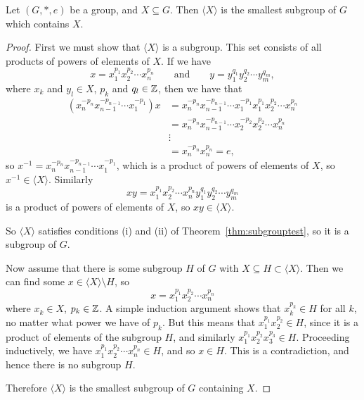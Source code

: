 \begin{theorem}\label{thm:subgroupgenbyset}
  Let $(G, \ast, e)$ be a group, and $X \subseteq G$.  Then $\langle X
  \rangle$ is the smallest subgroup of $G$ which contains $X$.
\end{theorem}
\begin{proof}
  First we must show that $\langle X \rangle$ is a subgroup.  This set
  consists of all products of powers of elements of $X$.  If we have
  \[
    x = x_{1}^{p_{1}}x_{2}^{p_{2}}\cdots x_{n}^{p_{n}} \qquad \text{and}
    \qquad y = y_{1}^{q_{1}}y_{2}^{q_{2}}\cdots y_{m}^{q_{m}},
  \]
  where $x_{k}$ and $y_{l} \in X$, $p_{k}$ and $q_{l} \in \mathbb{Z}$, then
  we have that
  \begin{align*}
    (x_{n}^{-p_{n}}x_{n-1}^{-p_{n-1}}\cdots x_{1}^{-p_{1}})x
     &= x_{n}^{-p_{n}}x_{n-1}^{-p_{n-1}}\cdots x_{1}^{-p_{1}}x_{1}^{p_{1}}x_{2}^{p_{2}}\cdots x_{n}^{p_{n}}\\
     &= x_{n}^{-p_{n}}x_{n-1}^{-p_{n-1}}\cdots x_{2}^{-p_{2}}x_{2}^{p_{2}}\cdots x_{n}^{p_{n}} \\
     &\vdots \\
     & = x_{n}^{-p_{n}}x_{n}^{p_{n}} = e,
  \end{align*}
  so $x^{-1} = x_{n}^{-p_{n}}x_{n-1}^{-p_{n-1}}\cdots x_{1}^{-p_{1}}$, which
  is a product of powers of elements of $X$, so $x^{-1} \in \langle X \rangle$.
  Similarly
  \[
    xy = x_{1}^{p_{1}}x_{2}^{p_{2}}\cdots x_{n}^{p_{n}}y_{1}^{q_{1}}y_{2}^{q_{2}}\cdots y_{m}^{q_{m}}
  \]
  is a product of powers of elements of $X$, so $xy \in \langle X \rangle$.
  
  So $\langle X \rangle$ satisfies conditions (i) and (ii) of Theorem~\ref{thm:subgrouptest},
  so it is a subgroup of $G$.
  
  Now assume that there is some subgroup $H$ of $G$ with $X \subseteq H \subset \langle X \rangle$.
  Then we can find some $x \in \langle X \rangle \setminus H$, so
  \[
    x = x_{1}^{p_{1}}x_{2}^{p_{2}}\cdots x_{n}^{p_{n}}
  \]
  where $x_{k} \in X$, $p_{k} \in \mathbb{Z}$.  A simple induction argument
  shows that $x_{k}^{p_{k}} \in H$ for all $k$, no matter what power we have
  of $p_{k}$.  But this means that $x_{1}^{p_{1}}x_{2}^{p_{2}} \in H$, since
  it is a product of elements of the subgroup $H$, and similarly
  $x_{1}^{p_{1}}x_{2}^{p_{2}}x_{3}^{p_{3}} \in H$.  Proceeding inductively, we
  have $x_{1}^{p_{1}}x_{2}^{p_{2}}\cdots x_{n}^{p_{n}} \in H$, and so $x \in H$.
  This is a contradiction, and hence there is no subgroup $H$.
  
  Therefore $\langle X \rangle$ is the smallest subgroup of $G$ containing $X$.
\end{proof}

